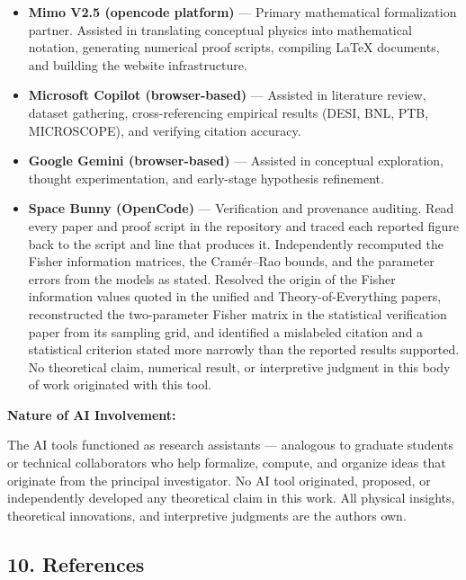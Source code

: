 \documentclass[
  10pt,
]{article}
\providecommand{\tightlist}{%
  \setlength{\itemsep}{0pt}\setlength{\parskip}{0pt}}
\begin{document}
\begin{itemize}
\tightlist
\item
  \textbf{Mimo V2.5 (opencode platform)} --- Primary mathematical
  formalization partner. Assisted in translating conceptual physics into
  mathematical notation, generating numerical proof scripts, compiling
  LaTeX documents, and building the website infrastructure.
\item
  \textbf{Microsoft Copilot (browser-based)} --- Assisted in literature
  review, dataset gathering, cross-referencing empirical results (DESI,
  BNL, PTB, MICROSCOPE), and verifying citation accuracy.
\item
  \textbf{Google Gemini (browser-based)} --- Assisted in conceptual
  exploration, thought experimentation, and early-stage hypothesis
  refinement.
\item
  \textbf{Space Bunny (OpenCode)} --- Verification and provenance
  auditing. Read every paper and proof script in the repository and
  traced each reported figure back to the script and line that produces
  it. Independently recomputed the Fisher information matrices, the
  Cramér--Rao bounds, and the parameter errors from the models as
  stated. Resolved the origin of the Fisher information values quoted in
  the unified and Theory-of-Everything papers, reconstructed the
  two-parameter Fisher matrix in the statistical verification paper from
  its sampling grid, and identified a mislabeled citation and a
  statistical criterion stated more narrowly than the reported results
  supported. No theoretical claim, numerical result, or interpretive
  judgment in this body of work originated with this tool.
\end{itemize}

\textbf{Nature of AI Involvement:}

The AI tools functioned as research assistants --- analogous to graduate
students or technical collaborators who help formalize, compute, and
organize ideas that originate from the principal investigator. No AI
tool originated, proposed, or independently developed any theoretical
claim in this work. All physical insights, theoretical innovations, and
interpretive judgments are the author\textquotesingle s own.

\hypertarget{references}{%
\subsection{10. References}\label{references}}
\end{document}
